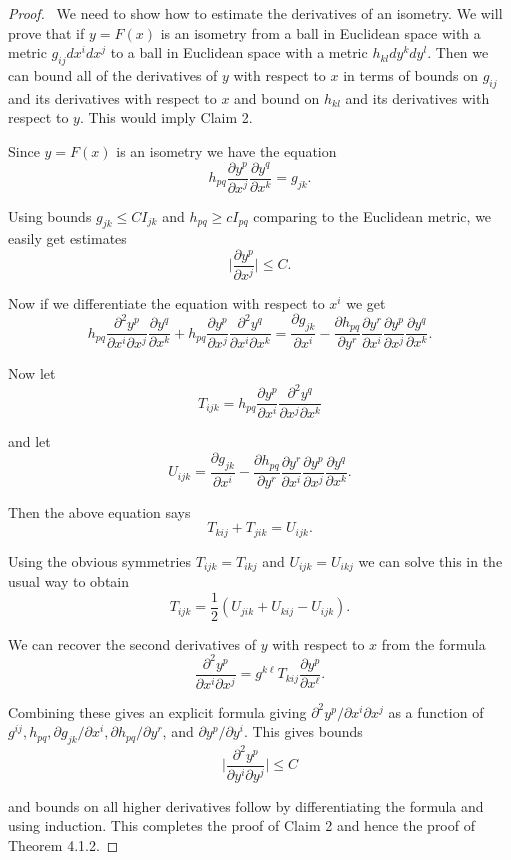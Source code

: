 \begin{proof}
\  We need to show how to
estimate the derivatives of an isometry. We will prove that if
$y=F(x)$ is an isometry from a ball in Euclidean space with a
metric $g_{ij}dx^idx^j$ to a ball in Euclidean space with a metric
$h_{kl}dy^kdy^l$. Then we can bound all of the derivatives of $y$
with respect to $x$ in terms of bounds on $g_{ij}$ and its
derivatives with respect to $x$ and bound on $h_{kl}$ and its
derivatives with respect to $y$. This would imply Claim 2.

Since $y=F(x)$ is an isometry we have the equation
$$
h_{pq} \frac{\partial y^p}{\partial x^j} \frac{\partial
y^q}{\partial x^k} = g_{jk}.
$$

\noindent Using bounds $g_{jk} \leq CI_{jk}$ and $h_{pq} \geq
cI_{pq}$ comparing to the Euclidean metric, we easily get
estimates
$$
\Big| \frac{\partial y^p}{\partial x^j} \Big| \leq C.
$$

\noindent Now if we differentiate the equation with respect to
$x^i$ we get
$$
h_{pq} \frac{\partial^2y^p}{\partial x^i \partial x^j}
\frac{\partial y^q}{\partial x^k} + h_{pq} \frac{\partial
y^p}{\partial x^j} \frac{\partial^2y^q}{\partial x^i \partial x^k}
= \frac{\partial g_{jk}}{\partial x^i} - \frac{\partial
h_{pq}}{\partial y^r} \frac{\partial y^r}{\partial x^i}
\frac{\partial y^p}{\partial x^j} \frac{\partial y^q}{\partial
x^k}.
$$

\noindent Now let
$$
T_{ijk} = h_{pq} \frac{\partial y^p}{\partial x^i}
\frac{\partial^2 y^q}{\partial x^j \partial x^k}
$$

\noindent and let
$$
U_{ijk} = \frac{\partial g_{jk}}{\partial x^i} - \frac{\partial
h_{pq}}{\partial y^r} \frac{\partial y^r}{\partial x^i}
\frac{\partial y^p}{\partial x^j} \frac{\partial y^q}{\partial
x^k}.
$$

\noindent Then the above equation says
$$
T_{kij}+T_{jik}=U_{ijk}.
$$

\noindent Using the obvious symmetries $T_{ijk}=T_{ikj}$ and
$U_{ijk} = U_{ikj}$ we can solve this in the usual way to obtain
$$
T_{ijk} = \frac{1}{2}(U_{jik}+U_{kij} - U_{ijk}).
$$

\noindent We can recover the second derivatives of $y$ with
respect to $x$ from the formula
$$
\frac{\partial^2 y^p}{\partial x^i \partial x^j} = g^{k
\ell}T_{kij} \frac{\partial y^p}{\partial x^\ell}.
$$

\noindent Combining these gives an explicit formula giving
$\partial^2y^p/\partial x^i \partial x^j$ as a function of
$g^{ij}, h_{pq}, \partial g_{jk}/\partial x^i, \partial
h_{pq}/\partial y^r$, and $ \partial y^p/\partial y^i$. This gives
bounds
$$
\Big| \frac{\partial^2 y^p}{\partial y^i \partial y^j}\Big| \leq C
$$

\noindent and bounds on all higher derivatives follow by
differentiating the formula and using induction. This completes
the proof of Claim 2 and hence the proof of Theorem 4.1.2.
\end{proof}
